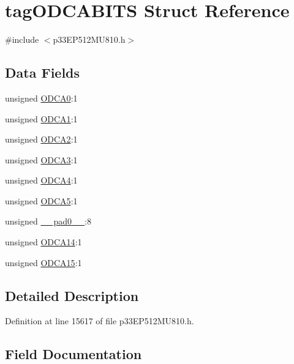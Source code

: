 \hypertarget{structtag_o_d_c_a_b_i_t_s}{}\section{tag\+O\+D\+C\+A\+B\+I\+TS Struct Reference}
\label{structtag_o_d_c_a_b_i_t_s}


{\ttfamily \#include $<$p33\+E\+P512\+M\+U810.\+h$>$}

\subsection*{Data Fields}
\begin{DoxyCompactItemize}
\item 
unsigned \hyperlink{structtag_o_d_c_a_b_i_t_s_a8fdf5c350b32a3fff64788a019c3b878}{O\+D\+C\+A0}\+:1
\item 
unsigned \hyperlink{structtag_o_d_c_a_b_i_t_s_ad641ec6e9b2c023ecb6079b393ef8b08}{O\+D\+C\+A1}\+:1
\item 
unsigned \hyperlink{structtag_o_d_c_a_b_i_t_s_ab5f8354231e819cfae57b76dff36231a}{O\+D\+C\+A2}\+:1
\item 
unsigned \hyperlink{structtag_o_d_c_a_b_i_t_s_ab010c350488f36087d3e5859430221b8}{O\+D\+C\+A3}\+:1
\item 
unsigned \hyperlink{structtag_o_d_c_a_b_i_t_s_a89c1d4a23873aed9286a8ce2cf8d86fc}{O\+D\+C\+A4}\+:1
\item 
unsigned \hyperlink{structtag_o_d_c_a_b_i_t_s_a92fe3798f3e46a011ac988294630bcc8}{O\+D\+C\+A5}\+:1
\item 
unsigned \hyperlink{structtag_o_d_c_a_b_i_t_s_adf71f3d8410c1f1dbbc96680a92c49af}{\+\_\+\+\_\+pad0\+\_\+\+\_\+}\+:8
\item 
unsigned \hyperlink{structtag_o_d_c_a_b_i_t_s_a0c16d0bbfdaa6cb9bdfd8c6009b0e4d2}{O\+D\+C\+A14}\+:1
\item 
unsigned \hyperlink{structtag_o_d_c_a_b_i_t_s_a9e75967887154d6c13c779be5bd471f6}{O\+D\+C\+A15}\+:1
\end{DoxyCompactItemize}


\subsection{Detailed Description}


Definition at line 15617 of file p33\+E\+P512\+M\+U810.\+h.



\subsection{Field Documentation}
\mbox{\label{structtag_o_d_c_a_b_i_t_s_adf71f3d8410c1f1dbbc96680a92c49af}} 
